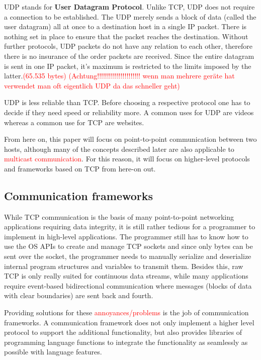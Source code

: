 \documentclass[conference]{IEEEtran}
\begin{document}
UDP stands for \textbf{User Datagram Protocol}. Unlike TCP, UDP does not require a connection to be established. The UDP merely sends a block of data (called the user datagram) all at once to a destination host in a single IP packet. There is nothing set in place to ensure that the packet reaches the destination. Without further protocols, UDP packets do not have any relation to each other, therefore there is no insurance of the order packets are received. Since the entire datagram is sent in one IP packet, it's maximum is restricted to the limits imposed by the latter.\textcolor{red}{(65.535 bytes)} \textcolor{red}{(Achtung!!!!!!!!!!!!!!!!!!!!!! wenn man mehrere geräte hat verwendet man oft eigentlich UDP da das schneller geht)}

UDP is less reliable than TCP. Before choosing a respective protocol one has to decide if they need speed or reliability more. A common uses for UDP are videos whereas a common use for TCP are websites.



From here on, this paper will focus on point-to-point communication between two hosts, although many of the concepts described later are also applicable to \textcolor{red}{multicast communication}.
For this reason, it will focus on higher-level protocols and frameworks based on TCP from here-on out.

\subsection{Communication frameworks}

While TCP communication is the basis of many point-to-point networking applications requiring data integrity, it is still rather tedious for a programmer to implement in high-level applications. The programmer still has to know how to use the OS APIs to create and manage TCP sockets and since only bytes can be sent over the socket, the programmer needs to manually serialize and deserialize internal program structures and variables to transmit them. Besides this, raw TCP is only really suited for continuous data streams, while many applications require event-based bidirectional communication where messages (blocks of data with clear boundaries) are sent back and fourth.

Providing solutions for these \textcolor{red}{annoyances/problems} is the job of communication frameworks. A communication framework does not only implement a higher level protocol to support the additional functionality, but also provides libraries of programming language functions to integrate the functionality as seamlessly as possible with language features.
\end{document}
